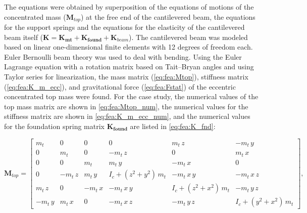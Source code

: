 \documentclass{article}
\begin{document}
The equations were  obtained by superposition of the equations of motions of the concentrated mass ($\mathbf{M}_{top}$) at the free end of the cantilevered beam, the equations for the support springs and the equations for the elasticity of the cantilevered beam itself ($\mathbf{K} = \mathbf{K_{mt}} + \mathbf{K_{found}}+\mathbf{K}_{beam}$). The cantilevered beam was modeled based on linear one-dimensional finite elements with 12 degrees of freedom each. Euler Bernoulli beam theory was used to deal with bending. Using the Euler Lagrange equation with a rotation matrix based on Tait–Bryan angles and using Taylor series for linearization, the mass matrix (\autoref{eq:fea:Mtop}), stiffness matrix (\autoref{eq:fea:K_m_ecc}), and gravitational force (\autoref{eq:fea:Fstat}) of the eccentric concentrated top mass were found. For the case study, the numerical values of the top mass matrix are shown in \autoref{eq:fea:Mtop_num}, the numerical values for the stiffness matrix are shown in \autoref{eq:fea:K_m_ecc_num}, and the numerical values for the foundation spring matrix $\mathbf{K_{found}}$ are listed in \autoref{eq:fea:K_fnd}:


\begin{small}
    \begin{equation}
       \mathbf{M}_{top}  = 
        \begin{bmatrix}
         m_{t}  & 0             & 0             & 0                                             & m_{t}\,z                                  & -m_{t}\,y           \\ 
         0             & m_{t}  & 0             & -m_{t}\,z                                 & 0                                             & m_{t}\,x            \\ 
         0             & 0              & m_{t}  & m_{t}\,y                                     & -m_{t}\,x                                    & 0                    \\ 
         0             & -m_{t}\,z & m_{t}\,y     & I_{c}+\left({z}^2+{y   }^2\right)\,m_{t} & -m_{t}\,x   \,y                             & -m_{t}\,x   \,z \\ 
         m_{t}\,z  & 0             & -m_{t}\,x    & -m_{t}\,x   \,y                             & I_{c}+\left({z}^2+{x   }^2\right)\,m_{t} & -m_{t}\,y   \,z \\
         -m_{t}\,y    & m_{t}\,x     & 0             & -m_{t}\,x   \,z                          & -m_{t}\,y   \,z                          & I_{c}+\left({y   }^2+{x   }^2\right)\,m_{t} 
        \end{bmatrix},
        \label{eq:fea:Mtop}
    \end{equation}
\end{small}
\end{document}
